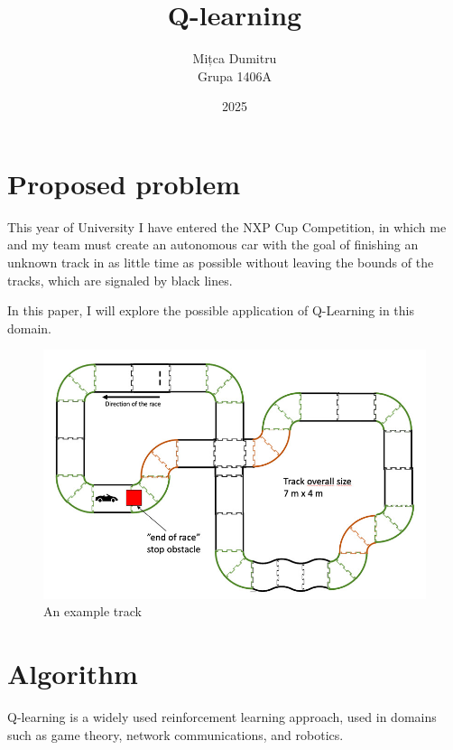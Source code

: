 \documentclass[12pt]{article}
\title{Q-learning}
\author{
  Mițca Dumitru\\
  Grupa 1406A
}
\date{2025}
\begin{document}
\maketitle

\hypersetup{linkbordercolor=1 1 1}
\tableofcontents
\hypersetup{linkbordercolor=1 0 0}

\singlespacing
\newpage

\section{Proposed problem}

This year of University I have entered the NXP Cup Competition, in which me and my team must
create an autonomous car with the goal of finishing an unknown track in as little time
as possible without leaving the bounds of the tracks, which are signaled by black lines.

In this paper, I will explore the possible application of Q-Learning in this domain.

\begin{figure}[H]
  \includegraphics[width=\linewidth]{nxp-track}
  \caption{An example track\protect\footnotemark}
\end{figure}


\newpage

\section{Algorithm}

Q-learning is a widely used reinforcement learning approach, used in domains such as game theory,
network communications, and robotics\cite{8836506}.
\end{document}

